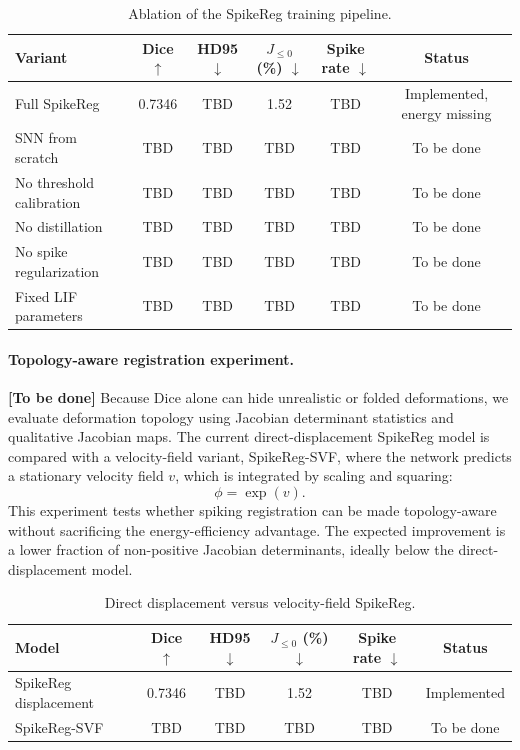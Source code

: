 \begin{table}[t]
\centering
\caption{Ablation of the SpikeReg training pipeline.}
\label{tab:training_ablation}
\begin{tabular}{lccccc}
\toprule
Variant & Dice $\uparrow$ & HD95 $\downarrow$ & $J_{\leq0}$ (\%) $\downarrow$ & Spike rate $\downarrow$ & Status \\
\midrule
Full SpikeReg & 0.7346 & TBD & 1.52 & TBD & Implemented, energy missing \\
SNN from scratch & TBD & TBD & TBD & TBD & To be done \\
No threshold calibration & TBD & TBD & TBD & TBD & To be done \\
No distillation & TBD & TBD & TBD & TBD & To be done \\
No spike regularization & TBD & TBD & TBD & TBD & To be done \\
Fixed LIF parameters & TBD & TBD & TBD & TBD & To be done \\
\bottomrule
\end{tabular}
\end{table}

\paragraph{Topology-aware registration experiment.}
\textbf{[To be done]} Because Dice alone can hide unrealistic or folded deformations, we evaluate deformation topology using Jacobian determinant statistics and qualitative Jacobian maps. The current direct-displacement SpikeReg model is compared with a velocity-field variant, SpikeReg-SVF, where the network predicts a stationary velocity field \(v\), which is integrated by scaling and squaring:
\begin{equation}
\phi = \exp(v).
\end{equation}
This experiment tests whether spiking registration can be made topology-aware without sacrificing the energy-efficiency advantage. The expected improvement is a lower fraction of non-positive Jacobian determinants, ideally below the direct-displacement model.

\begin{table}[t]
\centering
\caption{Direct displacement versus velocity-field SpikeReg.}
\label{tab:svf_ablation}
\begin{tabular}{lccccc}
\toprule
Model & Dice $\uparrow$ & HD95 $\downarrow$ & $J_{\leq0}$ (\%) $\downarrow$ & Spike rate $\downarrow$ & Status \\
\midrule
SpikeReg displacement & 0.7346 & TBD & 1.52 & TBD & Implemented \\
SpikeReg-SVF & TBD & TBD & TBD & TBD & To be done \\
\bottomrule
\end{tabular}
\end{table}

